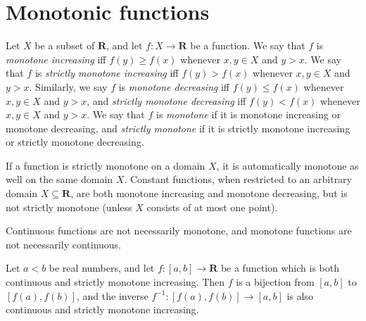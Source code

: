 \section{Monotonic functions}\label{sec 9.8}

\begin{definition}\label{9.8.1}
    Let \(X\) be a subset of \(\mathbf{R}\), and let \(f : X \to \mathbf{R}\) be a function.
    We say that \(f\) is \emph{monotone increasing} iff \(f(y) \geq f(x)\) whenever \(x, y \in X\) and \(y > x\).
    We say that \(f\) is \emph{strictly monotone increasing} iff \(f(y) > f(x)\) whenever \(x, y \in X\) and \(y > x\).
    Similarly, we say \(f\) is \emph{monotone decreasing} iff \(f(y) \leq f(x)\) whenever \(x, y \in X\) and \(y > x\), and \emph{strictly monotone decreasing} iff \(f(y) < f(x)\) whenever \(x, y \in X\) and \(y > x\).
    We say that \(f\) is \emph{monotone} if it is monotone increasing or monotone decreasing, and \emph{strictly monotone} if it is strictly monotone increasing or strictly monotone decreasing.
\end{definition}

\begin{note}
    If a function is strictly monotone on a domain \(X\), it is automatically monotone as well on the same domain \(X\).
    Constant functions, when restricted to an arbitrary domain \(X \subseteq \mathbf{R}\), are both monotone increasing and monotone decreasing, but is not strictly monotone
    (unless \(X\) consists of at most one point).
\end{note}

\begin{note}
    Continuous functions are not necessarily monotone, and monotone functions are not necessarily continuous.
\end{note}

\setcounter{theorem}{2}
\begin{proposition}\label{9.8.3}
    Let \(a < b\) be real numbers, and let \(f : [a, b] \to \mathbf{R}\) be a function which is both continuous and strictly monotone increasing.
    Then \(f\) is a bijection from \([a, b]\) to \([f(a), f(b)]\), and the inverse \(f^{-1} : [f(a), f(b)] \to [a, b]\) is also continuous and strictly monotone increasing.
\end{proposition}

